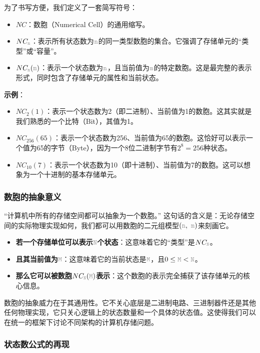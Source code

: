 \documentclass[12pt,a4paper,UTF8]{ctexart}
\newcommand{\var}[1]{\textcolor{lightgray}{\mathtt{#1}}}
\begin{document}
为了书写方便，我们定义了一套简写符号：
\begin{itemize}
    \item \textbf{$NC$}：数胞（Numerical Cell）的通用缩写。
    \item \textbf{$NC_{\var{n}}$}：表示所有状态数为$\var{n}$的同一类型数胞的集合。它强调了存储单元的“类型”或“容量”。
    \item \textbf{$NC_{\var{n}}(\var{m})$}：表示一个状态数为$\var{n}$，且当前值为$\var{m}$的特定数胞。这是最完整的表示形式，同时包含了存储单元的属性和当前状态。
\end{itemize}

\textbf{示例}：
\begin{itemize}
    \item $NC_2(1)$：表示一个状态数为2（即二进制）、当前值为1的数胞。这其实就是我们熟悉的一个比特（Bit），其值为1。
    \item $NC_{256}(65)$：表示一个状态数为256、当前值为65的数胞。这恰好可以表示一个值为65的字节（Byte），因为一个8位二进制字节有$2^8=256$种状态。
    \item $NC_{10}(7)$：表示一个状态数为10（即十进制）、当前值为7的数胞。这可以想象为一个十进制的基本存储单元。
\end{itemize}

\subsubsection{数胞的抽象意义}

“计算机中所有的存储空间都可以抽象为一个数胞。” 这句话的含义是：无论存储空间的实际物理实现如何，我们都可以用数胞的二元组模型$(\var{n},\ \var{m})$来刻画它。

\begin{itemize}
    \item \textbf{若一个存储单位可以表示$\var{N}$个状态}：这意味着它的“类型”是$NC_{\var{N}}$。
    \item \textbf{且其当前值为$\var{M}$}：这意味着它的当前状态是$\var{M}$，且$0 \leq \var{M} < \var{N}$。
    \item \textbf{那么它可以被数胞$NC_{\var{N}}(\var{M})$表示}：这个数胞的表示完全捕获了该存储单元的核心信息。
\end{itemize}

数胞的抽象威力在于其通用性。它不关心底层是二进制电路、三进制器件还是其他任何物理实现，它只关心逻辑上的状态数量和一个具体的状态值。这使得我们可以在统一的框架下讨论不同架构的计算机存储问题。

\subsubsection{状态数公式的再现}
\end{document}
